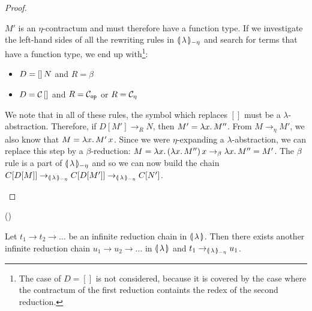 \begin{proof}
\begin{itemize}
\begin{itemize}
      $M'$ is an $\eta$-contractum and must therefore have a function
      type. If we investigate the left-hand sides of all the rewriting
      rules in ${\llparenthesis \, \lambda \, \rrparenthesis_{-\eta}}$ and search for terms that have a function type,
      we end up with\footnote{The case of $D = []$ is not considered,
        because it is covered by the case where the contractum of the first
        reduction containts the redex of the second reduction.}:

      \begin{itemize}
      \item $D = []\,N$ and $R = \beta$
      \item $D = \mathcal{C}\,[]$ and $R = \mathcal{C}_{\mathtt{op}}$ or $R = \mathcal{C}_\eta$
      \end{itemize}
      
      We note that in all of these rules, the symbol which replaces $[]$
      must be a $\lambda$-abstraction. Therefore, if $D[M'] \to_R N$, then
      $M' = \lambda x.\, M''$. From $M \to_\eta M'$, we also know that
      $M = \lambda x.\, M'\,x$. Since we were $\eta$-expanding a
      $\lambda$-abstraction, we can replace this step by a
      $\beta$-reduction:
      $M = \lambda x.\, (\lambda x.\, M'')\,x \to_\beta \lambda x.\, M'' =
      M'$. The $\beta$ rule is a part of ${\llparenthesis \, \lambda \, \rrparenthesis_{-\eta}}$ and so we can now build
      the chain $C[D[M]] \to_{\llparenthesis \, \lambda \, \rrparenthesis_{-\eta}} C[D[M']] \to_{\llparenthesis \, \lambda \, \rrparenthesis_{-\eta}} C[N']$.
    \end{itemize}
  \end{itemize}
\end{proof}

\begin{lemma}\label{lem:pulling-links}
  ()
  
  Let $t_1 \to t_2 \to \ldots$ be an infinite reduction chain in
  ${\llparenthesis \, \lambda \, \rrparenthesis}$. Then there exists another infinite reduction chain
  $u_1 \to u_2 \to \ldots$ in ${\llparenthesis \, \lambda \, \rrparenthesis}$ and $t_1 \to_{\llparenthesis \, \lambda \, \rrparenthesis_{-\eta}} u_1$.
\end{lemma}

